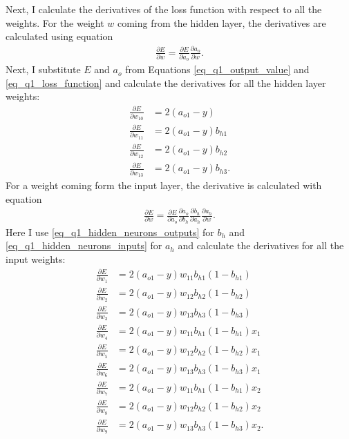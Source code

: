 Next, I calculate the derivatives of the loss function with respect to all the weights. For the weight $w$ coming from the hidden layer, the derivatives are calculated using equation
\begin{align*}
  \frac{\partial E}{\partial w} = \frac{\partial E}{\partial a_o} \frac{\partial a_o} {\partial w}.
\end{align*}
Next, I substitute $E$ and $a_o$ from Equations \ref{eq_q1_output_value} and \ref{eq_q1_loss_function} and calculate the derivatives for all the hidden layer weights:
\begin{align*}
  \frac{\partial E}{\partial w_{10}} &= 2 (a_{o1} - y) \\
  \frac{\partial E}{\partial w_{11}} &= 2 (a_{o1} - y) b_{h1} \\
  \frac{\partial E}{\partial w_{12}} &= 2 (a_{o1} - y) b_{h2} \\
  \frac{\partial E}{\partial w_{13}} &= 2 (a_{o1} - y) b_{h3}.
\end{align*}
For a weight coming form the input layer, the derivative is calculated with equation
\begin{align*}
  \frac{\partial E}{\partial w} = \frac{\partial E}{\partial a_o} \frac{\partial a_o} {\partial b_h} \frac{\partial b_h} {\partial a_h} \frac{\partial a_h} {\partial w}.
\end{align*}
Here I use \autoref{eq_q1_hidden_neurons_outputs} for $b_h$ and \autoref{eq_q1_hidden_neurons_inputs} for $a_h$ and calculate the derivatives for all the input weights:
\begin{align*}
  \frac{\partial E}{\partial w_{1}} &= 2 (a_{o1} - y) w_{11} b_{h1} (1 - b_{h1}) \\
  \frac{\partial E}{\partial w_{2}} &= 2 (a_{o1} - y) w_{12} b_{h2} (1 - b_{h2}) \\
  \frac{\partial E}{\partial w_{3}} &= 2 (a_{o1} - y) w_{13} b_{h3} (1 - b_{h3}) \\
  \frac{\partial E}{\partial w_{4}} &= 2 (a_{o1} - y) w_{11} b_{h1} (1 - b_{h1}) x_1 \\
  \frac{\partial E}{\partial w_{5}} &= 2 (a_{o1} - y) w_{12} b_{h2} (1 - b_{h2}) x_1 \\
  \frac{\partial E}{\partial w_{6}} &= 2 (a_{o1} - y) w_{13} b_{h3} (1 - b_{h3}) x_1 \\
  \frac{\partial E}{\partial w_{7}} &= 2 (a_{o1} - y) w_{11} b_{h1} (1 - b_{h1}) x_2 \\
  \frac{\partial E}{\partial w_{8}} &= 2 (a_{o1} - y) w_{12} b_{h2} (1 - b_{h2}) x_2 \\
  \frac{\partial E}{\partial w_{9}} &= 2 (a_{o1} - y) w_{13} b_{h3} (1 - b_{h3}) x_2.
\end{align*}

